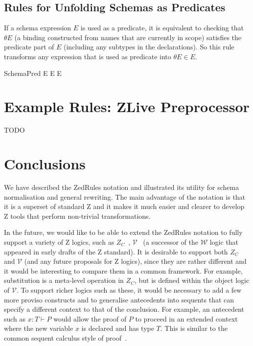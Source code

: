 \documentclass{entcs}
\newcommand{\V}{\mathcal{V}}
\newcommand{\Zc}{Z_C}
\begin{document}
\subsection{Rules for Unfolding Schemas as Predicates}

If a schema expression $E$ is used as a predicate, it is equivalent to
checking that $\theta E$ (a binding constructed from names that are
currently in scope) satisfies the predicate part of $E$ 
(including any subtypes in the declarations).  So this rule
transforms any expression that is used as predicate into $\theta E \in E$.
\begin{zedrule}{SchemaPred}
  E \iff \theta E \in E
\end{zedrule}


\section{Example Rules: ZLive Preprocessor} \label{sec:zlive}

TODO

\section{Conclusions} \label{sec:concl}

We have described the ZedRules notation and illustrated its utility
for schema normalisation and general rewriting.  The main advantage
of the notation is that it is a superset of standard Z and it makes it
much easier and clearer to develop Z tools that perform non-trivial
transformations.


In the future, we would like to be able to extend the ZedRules notation to
fully support a variety of Z logics, such as
$\Zc$~\cite{henson:revising-z-1-99,henson:revising-z-2-99},
$\V$~\cite{brien:calculus-schemas-z00} (a successor of the
$\mathcal{W}$ logic that appeared in early drafts of the Z standard).  It
is desirable to support both $\Zc$ and $\V$ (and any future
proposals for Z logics), since they are rather different and it would be
interesting to compare them in a common framework.  For example,
substitution is a meta-level operation in $\Zc$, but is defined within the
object logic of $\V$.  To support richer logics such as these,
it would be necessary to add a few more proviso constructs and to
generalise antecedents into sequents that can specify a different context
to that of the conclusion.  For example, an antecedent such as $x:T \vdash
P$ would allow the proof of $P$ to proceed in an extended context where the
new variable $x$ is declared and has type $T$.  This is 
similar to the common sequent calculus style of
proof~\cite{girard:proofs-types90}. 
\end{document}
